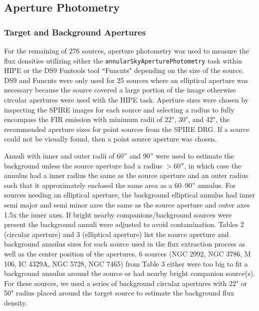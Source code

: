 \subsection{Aperture Photometry}\label{aperture}
\subsubsection{Target and Background Apertures}
For the remaining of 276 sources, aperture photometry was used to measure the flux densities utilizing either the \texttt{annularSkyAperturePhotometry} task within HIPE or the DS9 Funtools tool ``Funcnts" depending on the size of the source. DS9 and Funcnts were only used for 25 sources where an elliptical aperture was necessary because the source covered a large portion of the image otherwise circular apertures were used with the HIPE task. Aperture sizes were chosen by inspecting the SPIRE images for each source and selecting a radius to fully encompass the FIR emission with minimum radii of 22", 30", and 42", the recommended aperture sizes for point sources from the SPIRE DRG. If a source could not be visually found, then a point source aperture was chosen. 

Annuli with inner and outer radii of 60'' and 90'' were used to estimate the background unless the source aperture had a radius $>60''$, in which case the annulus had a inner radius the same as the source aperture and an outer radius such that it approximately enclosed the same area as a 60--90'' annulus. For sources needing an elliptical aperture, the background elliptical annulus had inner semi major and semi minor axes the same as the source aperture and outer axes 1.5x the inner axes. If bright nearby companions/background sources were present the background annuli were adjusted to avoid contamination. Tables 2 (circular aperture) and 3 (elliptical aperture) list the source aperture and background annulus sizes for each source used in the flux extraction process as well as the center position of the apertures. 6 sources (NGC 2992, NGC 3786, M 106, IC 4329A, NGC 5728, NGC 7465) from Table 3 either were too big to fit a background annulus around the source or had nearby bright companion source(s). For these sources, we used a series of background circular apertures with 22" or 50" radius placed around the target source to estimate the background flux density.


